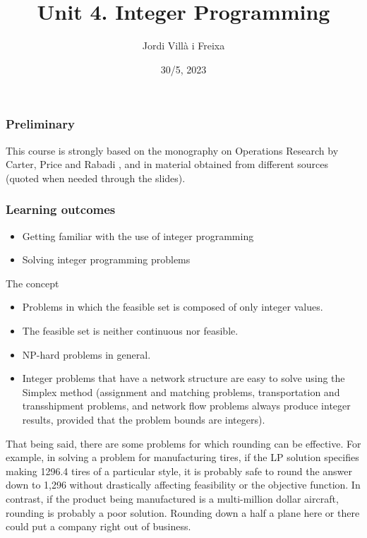 \documentclass[c]{beamer}
\title[Introduction]{Unit 4. Integer Programming}
\author{Jordi Villà i Freixa}
\institute[FCTE]{
Universitat de Vic - Universitat Central de Catalunya \\
Study Abroad. Operations Research\\
\medskip
\textit{jordi.villa@uvic.cat}
}
\date{30/5, 2023}
\begin{document}
\begin{frame}
\titlepage
\end{frame}

\begin{frame}
\frametitle{Preliminary}
This course is strongly based on the monography on Operations Research by Carter, Price and Rabadi \cite{carter}, and in material obtained from different sources (quoted when needed through the slides).
\end{frame}


\begin{frame}
\frametitle{Learning outcomes}
\begin{itemize}
  \item Getting familiar with the use of integer programming
  \item Solving integer programming problems
\end{itemize}
\end{frame}

\begin{frame}{The concept}
\begin{itemize}
  \item Problems in which the feasible set is composed of only integer values.
  \item The feasible set is neither continuous nor feasible.
  \item NP-hard problems in general.
  \item Integer problems that have a network structure are easy to solve using the Simplex method (assignment and matching problems, transportation and transshipment problems, and network flow problems always produce integer results, provided that the problem bounds are integers).
\end{itemize}
\end{frame}

That being said, there are some problems for which rounding can be effective. For example, in solving a problem for manufacturing tires, if the LP solution specifies making 1296.4 tires of a particular style, it is probably safe to round the answer down to 1,296 without drastically affecting feasibility or the objective function. In contrast, if the product being manufactured is a multi-million dollar aircraft, rounding is probably a poor solution. Rounding down a half a plane here or there could put a company right out of business.
\end{document}
